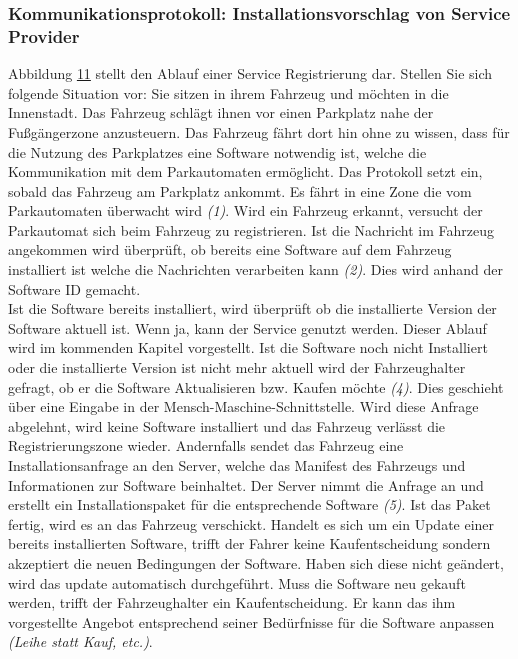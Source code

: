 \subsubsection{Kommunikationsprotokoll: Installationsvorschlag von Service Provider}
Abbildung \hyperref[img:installationsProtokollExtern]{11} stellt den Ablauf einer Service Registrierung dar. Stellen Sie sich folgende Situation vor: Sie sitzen in ihrem Fahrzeug und möchten in die Innenstadt. Das Fahrzeug schlägt ihnen vor einen Parkplatz nahe der Fußgängerzone anzusteuern. Das Fahrzeug fährt dort hin ohne zu wissen, dass für die Nutzung des Parkplatzes eine Software notwendig ist, welche die Kommunikation mit dem Parkautomaten ermöglicht. Das Protokoll setzt ein, sobald das Fahrzeug am Parkplatz ankommt. Es fährt in eine Zone die vom Parkautomaten überwacht wird \textit{(1)}. Wird ein Fahrzeug erkannt, versucht der Parkautomat sich beim Fahrzeug zu registrieren. Ist die Nachricht im Fahrzeug angekommen wird überprüft, ob bereits eine Software auf dem Fahrzeug installiert ist welche die Nachrichten verarbeiten kann \textit{(2)}. Dies wird anhand der Software ID gemacht.\\
Ist die Software bereits installiert, wird überprüft ob die installierte Version der Software aktuell ist. Wenn ja, kann der Service genutzt werden. Dieser Ablauf wird im kommenden Kapitel vorgestellt. Ist die Software noch nicht Installiert oder die installierte Version ist nicht mehr aktuell wird der Fahrzeughalter gefragt, ob er die Software Aktualisieren bzw. Kaufen möchte \textit{(4)}. Dies geschieht über eine Eingabe in der Mensch-Maschine-Schnittstelle. Wird diese Anfrage abgelehnt, wird keine Software installiert und das Fahrzeug verlässt die Registrierungszone wieder. Andernfalls sendet das Fahrzeug eine Installationsanfrage an den Server, welche das Manifest des Fahrzeugs und Informationen zur Software beinhaltet. Der Server nimmt die Anfrage an und erstellt ein Installationspaket für die entsprechende Software \textit{(5)}. Ist das Paket fertig, wird es an das Fahrzeug verschickt. Handelt es sich um ein Update einer bereits installierten Software, trifft der Fahrer keine Kaufentscheidung sondern akzeptiert die neuen Bedingungen der Software. Haben sich diese nicht geändert, wird das update automatisch durchgeführt. Muss die Software neu gekauft werden, trifft der Fahrzeughalter ein Kaufentscheidung. Er kann das ihm vorgestellte Angebot entsprechend seiner Bedürfnisse für die Software anpassen \textit{(Leihe statt Kauf, etc.)}.
